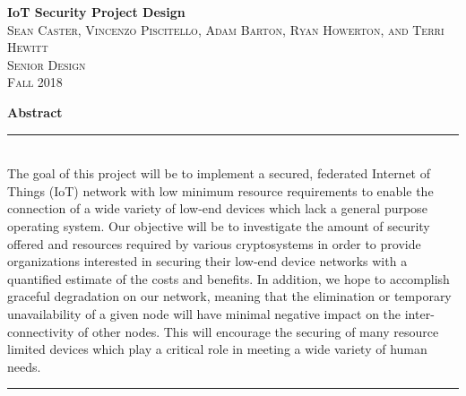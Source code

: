 \documentclass[tikz,a4paper,titlepage]{article}
\begin{document}
\begin{titlepage}
\vspace*{\fill}

\newcommand{\HRule}{\rule{\linewidth}{0.5mm}} %

\center %


{ \huge \bfseries IoT Security Project Design}\\[0.4cm] %


\textsc{\LARGE Sean Caster, Vincenzo Piscitello, Adam Barton, Ryan Howerton, and Terri Hewitt}\\[0.5cm] %
\textsc{\Large Senior Design}\\[0.5cm] %
\textsc{\large Fall 2018}\\[2.5cm] %


\begin{minipage}{0.8\textwidth}  %
\textbf{\large Abstract} \\
\HRule \\[0.4cm]
The goal of this project will be to implement a secured, federated Internet of Things (IoT) network with low minimum resource requirements to enable the connection of a wide variety of low-end devices which lack a general purpose operating system. Our objective will be to investigate the amount of security offered and resources required by various cryptosystems in order to provide organizations interested in securing their low-end device networks with a quantified estimate of the costs and benefits. In addition, we hope to accomplish graceful degradation on our network, meaning that the elimination or temporary unavailability of a given node will have minimal negative impact on the inter-connectivity of other nodes. This will encourage the securing of many resource limited devices which play a critical role in meeting a wide variety of human needs.
\\[0.4cm]
\HRule \\[1.5cm]
\end{minipage}


\end{titlepage}
\end{document}
